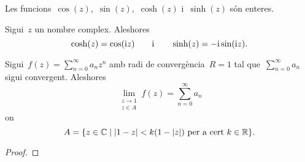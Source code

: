 \documentclass[../Apunts.tex]{subfiles}
\begin{document}
    \begin{observation}
        Les funcions~\(\cos(z)\),~\(\sin(z)\),~\(\cosh(z)\)
        i~\(\sinh(z)\) són enteres.
    \end{observation}
    \begin{observation}
        Sigui~\(z\) un nombre complex.
        Aleshores
        \begin{equation*}
            \cosh(z)=\cos(\mathrm{i} z)\qquad\text{i}\qquad\sinh(z)=-\mathrm{i}\sin(\mathrm{i} z).
        \end{equation*}
    \end{observation}
    \begin{theorem}
        \label{thm:Teorema d'Abel per sèries de potències complexes}
        Sigui~\(f(z)=\sum_{n=0}^{\infty}a_{n}z^{n}\) amb radi de
        convergència~\(R=1\) tal que~\(\sum_{n=0}^{\infty}a_{n}\) sigui convergent.
        Aleshores
        \[\lim_{\substack{z\to1\\z\in A}}f(z)=\sum_{n=0}^{\infty}a_{n}\]
        on
        \begin{equation}
            \label{eq:1:thm:Teorema d'Abel per sèries de potències complexes}
            A=\{z\in\CC\mid\abs{1-z}<k(1-\modul{z})\text{ per a cert }k\in\RR\}.
        \end{equation}
    \end{theorem}
    \begin{proof}
%       
    \end{proof}
\end{document}
